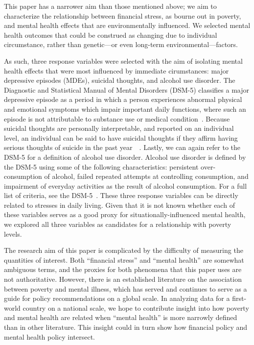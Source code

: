 \documentclass{article}
\begin{document}
This paper has a narrower aim than those mentioned above;
we aim to characterize the relationship between
financial stress, as bourne out in poverty,
and mental health effects
that are environmentally influenced.
We selected mental health outcomes that
could be construed as changing due to
individual circumstance,
rather than genetic---or even long-term environmental---factors.

As such, three response variables were selected
with the aim of isolating mental health effects that were
most influenced by immediate cirumstances:
major depressive episodes (MDEs),
suicidal thoughts,
and alcohol use disorder.
The Diagnostic and Statistical Manual of Mental Disorders (DSM-5)
classifies a major depressive episode as
a period in which a person experiences
abnormal physical and emotional symptoms
which impair important daily functions,
where such an episode is not attributable to
substance use or medical condition~\cite{apa_2013}.
Because suicidal thoughts are personally interpretable,
and reported on an individual level,
an individual can be said to have
suicidal thoughts if they affirm
having serious thoughts of suicide
in the past year~\cite{samhsa_data}~\cite{apa_2013}.
Lastly, we can again refer to the DSM-5
for a definition of alcohol use disorder.
Alcohol use disorder is defined by the DSM-5
using some of the following characteristics:
persistent over-consumption of alcohol,
failed repeated attempts at controlling consumption,
and impairment of everyday activities
as the result of alcohol consumption.
For a full list of criteria, see the DSM-5~\cite{apa_2013}.
These three response variables can be directly
related to stresses in daily living.
Given that it is not known whether
each of these variables serves as a good proxy
for situationally-influenced mental health,
we explored all three variables
as candidates for a relationship with poverty levels.

The research aim of this paper is complicated by
the difficulty of measuring the quantities of interest.
Both ``financial stress'' and ``mental health''
are somewhat ambiguous terms,
and the proxies for both phenomena that
this paper uses are not authoritative.
However, there is an established literature on the
association between poverty and mental illness,
which has served and continues to serve
as a guide for policy recommendations on a global scale.
In analyzing data for a first-world country
on a national scale, we hope to contribute insight
into how poverty and mental health are related
when ``mental health'' is more narrowly defined than
in other literature.
This insight could in turn show how financial policy
and mental health policy intersect.
\end{document}
